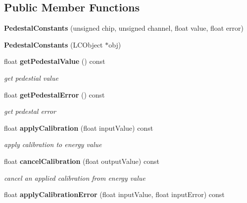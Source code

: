 \subsection*{Public Member Functions}
\begin{DoxyCompactItemize}
\item 
{\bfseries PedestalConstants} (unsigned chip, unsigned channel, float value, float error)\label{classCALICE_1_1PedestalConstants_ae24d817e0c641d205edc72170c76768f}

\item 
{\bfseries PedestalConstants} (LCObject $\ast$obj)\label{classCALICE_1_1PedestalConstants_add3293c896cfe98d71dcd6587bd196b4}

\item 
float {\bf getPedestalValue} () const \label{classCALICE_1_1PedestalConstants_a3c5742fc37c92c48163353c50b15458c}

\begin{DoxyCompactList}\small\item\em get pedestial value \item\end{DoxyCompactList}\item 
float {\bf getPedestalError} () const \label{classCALICE_1_1PedestalConstants_a34fe2cae3c531323401f9c63cb107167}

\begin{DoxyCompactList}\small\item\em get pedestal error \item\end{DoxyCompactList}\item 
float {\bf applyCalibration} (float inputValue) const \label{classCALICE_1_1PedestalConstants_abbcc4190367b281e817a54467f7d7ed2}

\begin{DoxyCompactList}\small\item\em apply calibration to energy value \item\end{DoxyCompactList}\item 
float {\bf cancelCalibration} (float outputValue) const \label{classCALICE_1_1PedestalConstants_aba93442424d99e1e2b2d1c53b36280f9}

\begin{DoxyCompactList}\small\item\em cancel an applied calibration from energy value \item\end{DoxyCompactList}\item 
float {\bf applyCalibrationError} (float inputValue, float inputError) const \label{classCALICE_1_1PedestalConstants_ac2c94c3d42b510de4c973ffb4a463469}


\end{DoxyCompactItemize}
